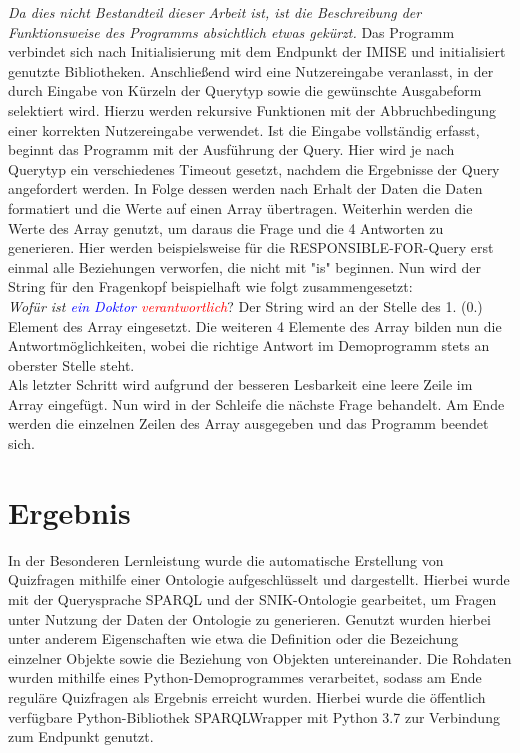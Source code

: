 \documentclass[headsepline,titlepage,ngerman,twoside,12pt]{report}
\newcommand\todo[1]{}%
\begin{document}
\textit{Da dies nicht Bestandteil dieser Arbeit ist, ist die Beschreibung der Funktionsweise des Programms absichtlich etwas gekürzt.}
Das Programm verbindet sich nach Initialisierung mit dem Endpunkt der IMISE und initialisiert genutzte Bibliotheken.
Anschließend wird eine Nutzereingabe veranlasst, in der durch Eingabe von Kürzeln der Querytyp sowie die gewünschte Ausgabeform selektiert wird.
Hierzu werden rekursive Funktionen mit der Abbruchbedingung einer korrekten Nutzereingabe verwendet.
Ist die Eingabe vollständig erfasst, beginnt das Programm mit der Ausführung der Query.
Hier wird je nach Querytyp ein verschiedenes Timeout gesetzt, nachdem die Ergebnisse der Query angefordert werden.
In Folge dessen werden nach Erhalt der Daten die Daten formatiert und die Werte auf einen Array übertragen.
Weiterhin werden die Werte des Array genutzt, um daraus die Frage und die 4 Antworten zu generieren.
Hier werden beispielsweise für die RESPONSIBLE-FOR-Query erst einmal alle Beziehungen verworfen, die nicht mit "is" beginnen.
Nun wird der String für den Fragenkopf beispielhaft wie folgt zusammengesetzt:\\
\textit{Wofür ist \textcolor{blue}{ein Doktor} \textcolor{red}{verantwortlich}}?
Der String wird an der Stelle des 1. (0.) Element des Array eingesetzt.
Die weiteren 4 Elemente des Array bilden nun die Antwortmöglichkeiten, wobei die richtige Antwort im Demoprogramm stets an oberster Stelle steht. \\
Als letzter Schritt wird aufgrund der besseren Lesbarkeit eine leere Zeile im Array eingefügt.
Nun wird in der Schleife die nächste Frage behandelt.
Am Ende werden die einzelnen Zeilen des Array ausgegeben und das Programm beendet sich.


\chapter{Ergebnis}
\todo{
Im Ergebniskapitel soll beschrieben werden, inwiefern Sie Ihre in 1.2/1.3 aufgestellten Ziele bzw. Aufgaben erreicht habe oder auch weshalb sie (teilweise) nicht erreicht werden konnten.
So soll es möglich sein, dass ein Leser von der Arbeit lediglich die Einleitung und die Zusammenfassung liest und doch die Ergebnisse der Arbeit erfassen kann.
Dieses Kapitel kann auch in mehrere Unterkapitel aufgeteilt werden, wenn das sinnvoll ist!
}

In der Besonderen Lernleistung wurde die automatische Erstellung von Quizfragen mithilfe einer Ontologie aufgeschlüsselt und dargestellt.
Hierbei wurde mit der Querysprache SPARQL und der SNIK-Ontologie gearbeitet, um Fragen unter Nutzung der Daten der Ontologie zu generieren.
Genutzt wurden hierbei unter anderem Eigenschaften wie etwa die Definition oder die Bezeichung einzelner Objekte sowie die Beziehung von Objekten untereinander.
Die Rohdaten wurden mithilfe eines Python-Demoprogrammes verarbeitet, sodass am Ende reguläre Quizfragen als Ergebnis erreicht wurden.
Hierbei wurde die öffentlich verfügbare Python-Bibliothek SPARQLWrapper mit Python 3.7 zur Verbindung zum Endpunkt genutzt.
\end{document}

